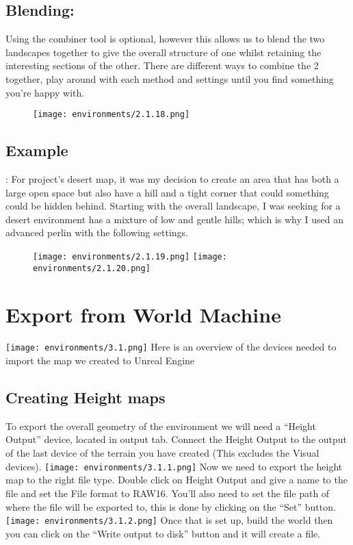 \documentclass[../main.tex]{subfiles}
\begin{document}
\subsection{Blending:}
Using the combiner tool is optional, however this allows us to blend the two landscapes together to give the overall structure of one whilst retaining the interesting sections of the other.
There are different ways to combine the 2 together, play around with each method and settings until you find something you’re happy with.
\begin{figure}[H]
\texttt{[image: environments/2.1.18.png]}
\end{figure}

\subsection{Example}:
For project’s desert map, it was my decision to create an area that has both a large open space but also have a hill and a tight corner that could something could be hidden behind.
Starting with the overall landscape, I was seeking for a desert environment has a mixture of low and gentle hills; which is why I used an advanced perlin with the following settings.
\begin{figure}[H]
\texttt{[image: environments/2.1.19.png]}
\texttt{[image: environments/2.1.20.png]}
\end{figure}
\section{Export from World Machine}
\texttt{[image: environments/3.1.png]}
Here is an overview of the devices needed to import the map we created to Unreal Engine

\subsection{Creating Height maps}
To export the overall geometry of the environment we will need a “Height Output” device, located in output tab. Connect the Height Output to the output of the last device of the terrain you have created (This excludes the Visual devices).
 \texttt{[image: environments/3.1.1.png]}
Now we need to export the height map to the right file type. Double click on Height Output and give a name to the file and set the File format to RAW16. You’ll also need to set the file path of where the file will be exported to, this is done by clicking on the “Set” button.
\texttt{[image: environments/3.1.2.png]}
Once that is set up, build the world then you can click on the “Write output to disk” button and it will create a file.
\end{document}
